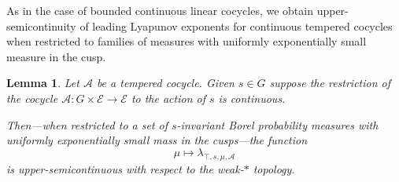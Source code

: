 \documentclass[10pt,reqno]{amsart}
\theoremstyle{Theorem}
\newtheorem{lemma}[theorem]{Lemma}
\theoremstyle{definition}
\theoremstyle{remark}
\def\calA{\mathcal A}
\def\calE{\mathcal E}
\begin{document}
As in the case of bounded continuous linear cocycles, we  obtain  upper-semicontinuity of leading Lyapunov exponents   for continuous tempered cocycles when restricted to families of  measures with uniformly exponentially  small measure in the cusp.


\begin{lemma}\label{claim:jjjiiilllkkk}
Let $\calA$ be a tempered cocycle.  Given $s\in G$ suppose  the restriction of the cocycle  $\calA\colon G\times\calE\to \calE$ to the action of $s$ is continuous.

Then---when restricted to a set of $s$-invariant Borel probability measures with  uniformly exponentially small mass in the cusps---the function  $$\mu \mapsto \lambda_{\top,s,\mu, \calA} $$ is upper-semicontinuous with respect to the weak-$*$ topology.
\end{lemma}
\end{document}
